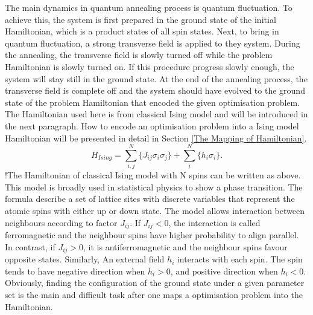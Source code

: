 \documentclass[twoside,a4paper,article]{combine}
\begin{document}
The main dynamics in quantum annealing process is quantum fluctuation. To achieve this, the system is first prepared in the ground state of the initial Hamiltonian, which is a product states of all spin states. Next, to bring in quantum fluctuation, a strong transverse field is applied to they system. During the annealing, the transverse field is slowly turned off while the problem Hamiltonian is slowly turned on. If this procedure progress slowly enough, the system will stay still in the ground state. At the end of the annealing process, the transverse field is complete off and the system should have evolved to the ground state of the problem Hamiltonian that encoded the given optimisation problem. The Hamiltonian used here is from classical Ising model and will be introduced in the next paragraph. How to encode an optimisation problem into a Ising model Hamiltonian will be presented in detail in Section \ref{The Mapping of Hamiltonian}. \\



\begin{equation}
H_{Ising}=\sum_{i,j}^N \{J_{ij} \sigma_i \sigma_j \}+ \sum_{i}^N \{h_i \sigma_i\}.
\end{equation}
!The Hamiltonian of classical Ising model with N spins can be written as above. This model is broadly used in statistical physics to show a phase transition. The formula describe a set of lattice sites with discrete variables that represent the atomic spins with either up or down state. The model allows interaction between neighbours according to factor $J_{ij}$. If $J_{ij}<0$, the interaction is called ferromagnetic and the neighbour spins have higher probability to align parallel. In contrast, if $J_{ij}>0$, it is antiferromagnetic and the neighbour spins favour opposite states. Similarly, An external field $h_i$ interacts with each spin. The spin tends to have negative direction when $h_i>0$, and positive direction when $h_i<0$. Obviously, finding the configuration of the ground state under a given parameter set is the main and difficult task after one maps a optimisation problem into the Hamiltonian. \\
\end{document}
